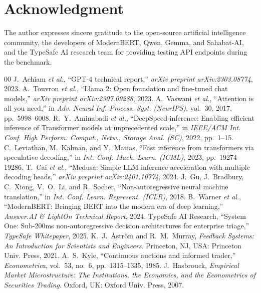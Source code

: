 \documentclass[journal,compsoc]{IEEEtran}
\begin{document}
\section*{Acknowledgment}
The author expresses sincere gratitude to the open-source artificial intelligence community, the developers of ModernBERT, Qwen, Gemma, and Sahabat-AI, and the TypeSafe AI research team for providing testing API endpoints during the benchmark.

\begin{thebibliography}{00}
 J.~Achiam \textit{et al.}, ``GPT-4 technical report,'' \textit{arXiv preprint arXiv:2303.08774}, 2023.
 A.~Touvron \textit{et al.}, ``Llama 2: Open foundation and fine-tuned chat models,'' \textit{arXiv preprint arXiv:2307.09288}, 2023.
 A.~Vaswani \textit{et al.}, ``Attention is all you need,'' in \textit{Adv. Neural Inf. Process. Syst. (NeurIPS)}, vol.~30, 2017, pp.~5998--6008.
 R.~Y.~Aminabadi \textit{et al.}, ``DeepSpeed-inference: Enabling efficient inference of Transformer models at unprecedented scale,'' in \textit{IEEE/ACM Int. Conf. High Perform. Comput., Netw., Storage Anal. (SC)}, 2022, pp.~1--15.
 C.~Leviathan, M.~Kalman, and Y.~Matias, ``Fast inference from transformers via speculative decoding,'' in \textit{Int. Conf. Mach. Learn. (ICML)}, 2023, pp.~19274--19286.
 T.~Cai \textit{et al.}, ``Medusa: Simple LLM inference acceleration with multiple decoding heads,'' \textit{arXiv preprint arXiv:2401.10774}, 2024.
 J.~Gu, J.~Bradbury, C.~Xiong, V.~O.~Li, and R.~Socher, ``Non-autoregressive neural machine translation,'' in \textit{Int. Conf. Learn. Represent. (ICLR)}, 2018.
 B.~Warner \textit{et al.}, ``ModernBERT: Bringing BERT into the modern era of deep learning,'' \textit{Answer.AI \& LightOn Technical Report}, 2024.
 TypeSafe AI Research, ``System One: Sub-200ms non-autoregressive decision architectures for enterprise triage,'' \textit{TypeSafe Whitepaper}, 2025.
 K.~J.~{\AA}str{\"o}m and R.~M.~Murray, \textit{Feedback Systems: An Introduction for Scientists and Engineers}. Princeton, NJ, USA: Princeton Univ. Press, 2021.
 A.~S.~Kyle, ``Continuous auctions and informed trader,'' \textit{Econometrica}, vol.~53, no.~6, pp.~1315--1335, 1985.
 J.~Hasbrouck, \textit{Empirical Market Microstructure: The Institutions, the Economics, and the Econometrics of Securities Trading}. Oxford, UK: Oxford Univ. Press, 2007.

\end{thebibliography}
\end{document}
